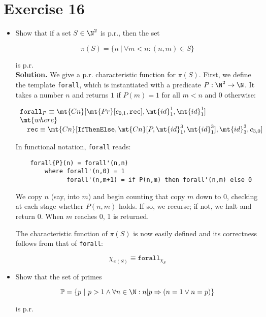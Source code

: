 \section{Exercise 16}

\begin{itemize}
	\item Show that if a set $S \in \N^2$ is p.r., then the set
	
	$$
		\pi(S) = \{n\ |\ \forall m < n: (n,m) \in S  \}
	$$
	
	is p.r.\\
	
	\textbf{Solution.} We give a p.r. characteristic function for $\pi(S)$. First, we define the template \texttt{forall}, which is instantiated with a predicate $P : \N^2 \rightarrow \N$. It takes a number $n$ and returns $1$ if $P(m) = 1$ for all $m < n$ and 0 otherwise:
	
	$$
		\begin{array}{l}
			\texttt{forall}_P \equiv \mt{Cn}[\mt{Pr}[c_{0,1}, \texttt{rec}], \mt{id}^1_1, \mt{id}^1_1] \\
			\mt{where}\\
			\quad \texttt{rec} \equiv \mt{Cn}[\texttt{IfThenElse}, \mt{Cn}[P, \mt{id}^3_1, \mt{id}^3_1], \mt{id}^3_3, c_{3,0}]
		\end{array}
	$$
	
	In functional notation, \texttt{forall} reads:
	
	\begin{verbatim}
	forall{P}(n) = forall'(n,n)
		where forall'(n,0) = 1
		      forall'(n,m+1) = if P(n,m) then forall'(n,m) else 0
	\end{verbatim}
	
	We copy $n$ (say, into $m$) and begin counting that copy $m$ down to 0, checking at each stage whether $P(n,m)$ holds. If so, we recurse; if not, we halt and return 0. When $m$ reaches 0, 1 is returned.
	
	The characteristic function of $\pi(S)$ is now easily defined and its correctness follows from that of \texttt{forall}:
	
	$$
		\chi_{\pi(S)} \equiv \texttt{forall}_{\chi_S}
	$$
	
	\item Show that the set of primes
	
	$$
		\mathbb{P} = \{p\ |\ p > 1 \wedge \forall n \in \N : n | p \Rightarrow (n = 1 \vee n = p) \}
	$$
	
	is p.r.\\
	

\end{itemize}
